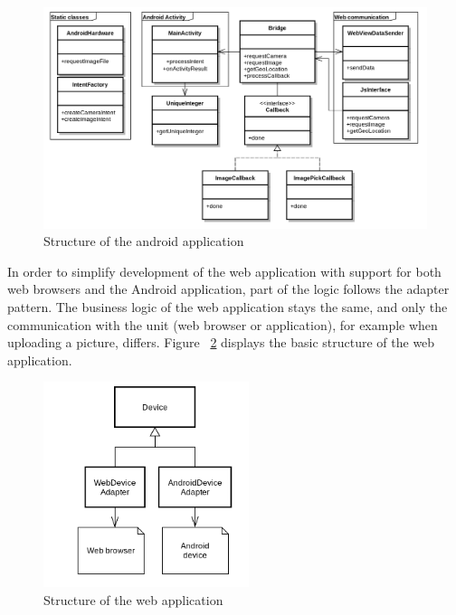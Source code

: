 \begin{figure}[h!]
	\centering
    \includegraphics[width=120mm,natwidth=800,natheight=600]{./img/polluxuml.png}
    \caption{Structure of the android application}
    \label{fig:nativeuml}
\end{figure}

In order to simplify development of the web application with support for both web browsers and the Android application, part of the logic follows the adapter pattern. The business logic of the web application stays the same, and only the communication with the unit (web browser or application), for example when uploading a picture, differs. Figure ~\ref{fig:nativewebuml} displays the basic structure of the web application. 

\begin{figure}[h!]
	\centering
    \includegraphics[width=60mm,natwidth=400,natheight=300]{./img/androidwebuml.png}
    \caption{Structure of the web application}
	\label{fig:nativewebuml}
\end{figure}

